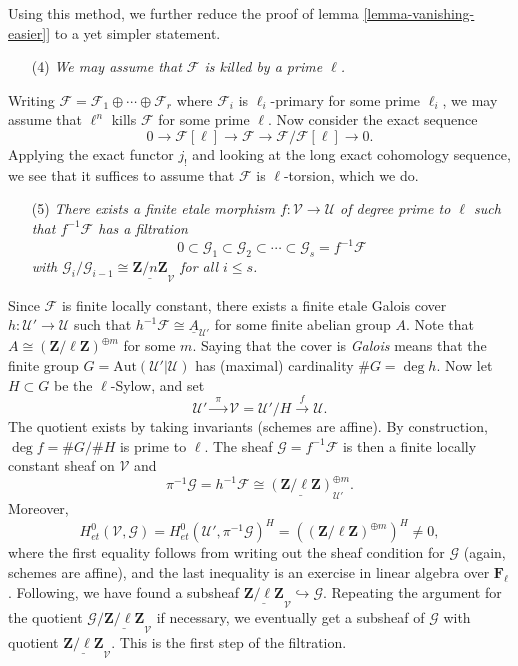 \medskip\noindent
Using this method, we further reduce the proof of lemma
\ref{lemma-vanishing-easier}] to a yet simpler
statement.
\begin{enumerate}
\item[(4)]
{\it We may assume that $\mathcal{F}$ is killed by a prime $\ell$.}
\end{enumerate}
Writing $\mathcal{F} = \mathcal{F}_1 \oplus \cdots \oplus \mathcal{F}_r$ where
$\mathcal{F}_i$ is $\ell_i$-primary for some prime $\ell_i$, we may assume that
$\ell^n$ kills $\mathcal{F}$ for some prime $\ell$. Now consider the exact
sequence
$$
0 \to \mathcal{F}[\ell] \to \mathcal{F} \to \mathcal{F}/\mathcal{F}[\ell] \to 0.
$$
Applying the exact functor $j_!$ and looking at the long exact cohomology
sequence, we see that it suffices to assume that $\mathcal{F}$ is
$\ell$-torsion, which we do.
\begin{enumerate}
\item[(5)]
{\it There exists a finite etale morphism $f: \mathcal{V} \to \mathcal{U}$ of
degree prime to $\ell$ such that $f^{-1} \mathcal{F}$ has a filtration
$$
0 \subset \mathcal{G}_1 \subset \mathcal{G}_2 \subset \cdots \subset
\mathcal{G}_s = f^{-1} \mathcal{F}
$$
with $\mathcal{G}_i /\mathcal{G}_{i-1} \cong
\underline{\mathbf{Z}/n\mathbf{Z}}_\mathcal{V}$ for all $i \leq s$.}
\end{enumerate}
Since $\mathcal{F}$ is finite locally constant, there exists a finite etale
Galois cover $h : \mathcal{U}' \to \mathcal{U}$ such that $h^{-1} \mathcal{F}
\cong \underline{A}_{\mathcal{U}'}$ for some finite abelian group $A$. Note
that $A \cong (\mathbf{Z}/\ell\mathbf{Z})^{\oplus m}$ for some $m$. Saying that
the cover is {\it Galois} means that the finite group $G =
\text{Aut}(\mathcal{U}' | \mathcal{U})$ has (maximal) cardinality $\# G = \deg
h$. Now let $H \subset G$ be the $\ell$-Sylow, and set
$$
\mathcal{U}' \xrightarrow{\ \ \pi \ \ } \mathcal{V} = \mathcal{U}'/H
\xrightarrow{\ \ f \ \ } \mathcal{U}.
$$
The quotient exists by taking invariants (schemes are affine). By construction,
$\deg f = \#G/\#H$ is prime to $\ell$. The sheaf $\mathcal{G} = f^{-1}
\mathcal{F}$ is then a finite locally constant sheaf on $\mathcal{V}$ and
$$
\pi^{-1} \mathcal{G} = h^{-1}\mathcal{F} \cong
\underline{(\mathbf{Z}/\ell\mathbf{Z})}^{\oplus m}_{\mathcal{U}'}.
$$
Moreover,
$$
H_{et}^0(\mathcal{V}, \mathcal{G}) = H_{et}^0(\mathcal{U}',
\pi^{-1}\mathcal{G})^H = \left((\mathbf{Z}/\ell\mathbf{Z})^{\oplus m}\right)^H
\neq 0,
$$
where the first equality follows from writing out the sheaf condition for
$\mathcal{G}$ (again, schemes are affine), and the last inequality is an
exercise in linear algebra over $\mathbf{F}_\ell$. Following, we have found a
subsheaf $\underline{\mathbf{Z}/\ell\mathbf{Z}}_\mathcal{V} \hookrightarrow
\mathcal{G}$. Repeating the argument for the quotient $\mathcal{G}/
\underline{\mathbf{Z}/\ell\mathbf{Z}}_\mathcal{V}$ if necessary, we eventually
get a subsheaf of $\mathcal{G}$ with quotient
$\underline{\mathbf{Z}/\ell\mathbf{Z}}_\mathcal{V}$. This is the first step of
the filtration.

